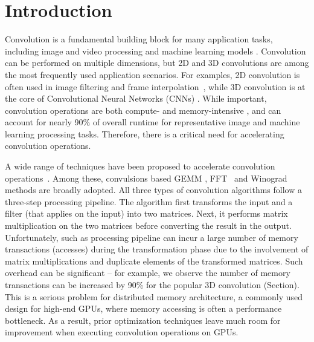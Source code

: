 \section{Introduction}
Convolution is a fundamental building block for many application tasks, including image and video processing and machine learning
models \cite{Perrot2014Fine,Ma2014Optimized,Rudi2015Image,Niklaus2017Video,Krizhevsky2012ImageNet,SimonyanZ14a,HeZRS16,SzegedyLJSRAEVR15}. Convolution can be performed on multiple dimensions, but 2D and 3D convolutions are among the most frequently used
application scenarios. For examples, 2D convolution is often used in image filtering and frame
interpolation~\cite{Perrot2014Fine,Ma2014Optimized,Rudi2015Image,Niklaus2017Video}, while 3D convolution is at the core of Convolutional
Neural Networks (CNNs) \cite{Krizhevsky2012ImageNet,SimonyanZ14a,HeZRS16,SzegedyLJSRAEVR15}. While important, convolution operations are both compute- and memory-intensive \cite{cavigelli2015accelerating},
and can account for nearly 90\% of overall runtime \cite{Li2016Performance} for representative image and machine learning processing tasks.
Therefore, there is a critical need for accelerating convolution operations.


A wide range of techniques have been proposed to accelerate convolution
operations~\cite{Iandola2014Communication,vasilache2014fast,lavin2016fast,cho2017mec,Zhen2018Optimizing,Vasudevan2017Parallel,Chellapilla2006High}.
Among these, convulsions based GEMM \cite{Vasudevan2017Parallel,Chellapilla2006High}, FFT~\cite{vasilache2014fast} and
Winograd~\cite{lavin2016fast} methods are broadly adopted. All three types of convolution algorithms follow a
three-step processing pipeline. The algorithm first transforms the input and a filter (that applies on the input) into
two matrices. Next, it performs matrix multiplication on the two matrices before converting the result in the output.
Unfortunately, such as processing pipeline can incur a large number of memory transactions (accesses) during the
transformation phase due to the involvement of matrix multiplications and duplicate elements of the transformed
matrices. Such overhead can be significant – for example, we observe the number of memory transactions can be increased
by 90\% for the popular 3D convolution (Section\FIXME{\ref{}}). This is a serious problem for distributed memory
architecture, a commonly used design for high-end GPUs, where memory accessing is often a performance bottleneck. As a
result, prior optimization techniques leave much room for improvement when executing convolution operations on GPUs.


